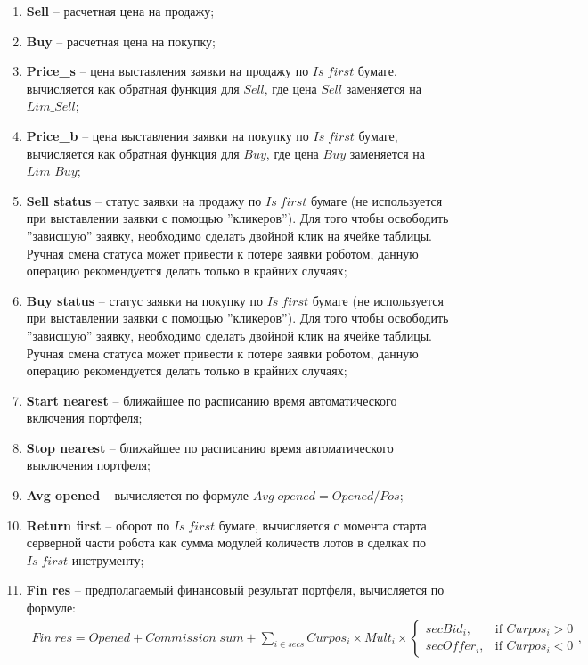 \begin{enumerate}
	\item \textbf{Sell} -- расчетная цена на продажу;
	\item \textbf{Buy} -- расчетная цена на покупку;
	\item \textbf{Price\_s} -- цена выставления заявки на продажу по $Is \; first$ бумаге, вычисляется как обратная функция для $Sell$, где цена $Sell$ заменяется на $Lim\_Sell$;
	\item \textbf{Price\_b} -- цена выставления заявки на покупку по $Is \; first$ бумаге, вычисляется как обратная функция для $Buy$, где цена $Buy$ заменяется на $Lim\_Buy$;
	\item \textbf{Sell status} -- статус заявки на продажу по $Is \; first$ бумаге (не используется при выставлении заявки с помощью ''кликеров''). Для того чтобы освободить
		''зависшую'' заявку, необходимо сделать двойной клик на ячейке таблицы. Ручная смена статуса может привести к потере заявки роботом, данную операцию рекомендуется делать
		только в крайних случаях;
	\item \textbf{Buy status} -- статус заявки на покупку по $Is \; first$ бумаге (не используется при выставлении заявки с помощью ''кликеров''). Для того чтобы освободить
		''зависшую'' заявку, необходимо сделать двойной клик на ячейке таблицы. Ручная смена статуса может привести к потере заявки роботом, данную операцию рекомендуется делать
		только в крайних случаях;
	\item \textbf{Start nearest} -- ближайшее по расписанию время автоматического включения портфеля;
	\item \textbf{Stop nearest} -- ближайшее по расписанию время автоматического выключения портфеля;
	\item \textbf{Avg opened} -- вычисляется по формуле $Avg \; opened = Opened / Pos$;
	\item \textbf{Return first} -- оборот по $Is \; first$ бумаге, вычисляется с момента старта серверной части робота как сумма модулей количеств лотов
		в сделках по $Is \; first$ инструменту;
	\item \textbf{Fin res} -- предполагаемый финансовый результат портфеля, вычисляется по формуле:
		\begin{align*}
		Fin \; res = Opened + Commission \; sum + \sum_{i \in secs}Curpos_i \times Mult_i \times \begin{cases} secBid_i, & \mbox{if } Curpos_i > 0 \\ secOffer_i, & \mbox{if } Curpos_i < 0 \end{cases},

\end{align*}
\end{enumerate}
